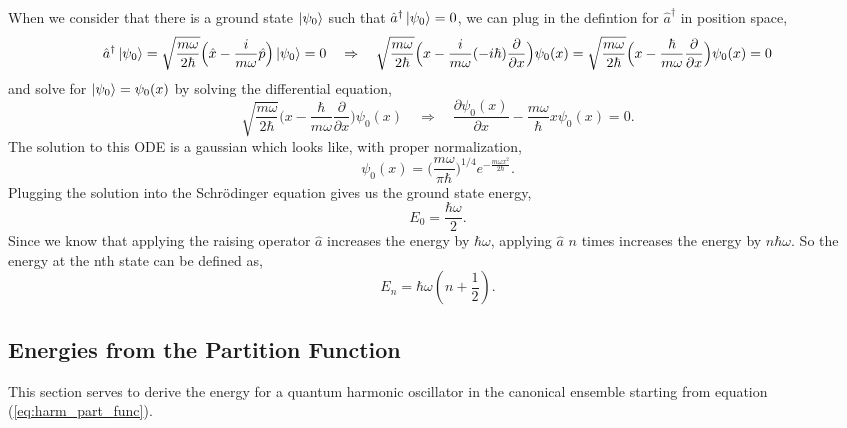 \documentclass{article}
\newcommand{\be}{\begin{equation}}
\newcommand{\ee}{\end{equation}}
\begin{document}
When we consider that there is a ground state $\ket{\psi_0}$ such that $\hat{a}^{\dagger}\ket{\psi_0} = 0$, we can plug in the defintion for $\hat{a}^{\dagger}$ in position space,
\be
  \hat{a}^{\dagger} \ket{\psi_0} = \sqrt{\frac{m \omega}{2\hbar}}\Big(\hat{x} - \frac{i}{m \omega} \hat{p} \Big)\ket{\psi_0} = 0 \quad \Rightarrow \quad \sqrt{\frac{m \omega}{2\hbar}}\Big(x - \frac{i}{m \omega} (-i \hbar) \frac{\partial}{\partial x} \Big) \psi_0(x) = \sqrt{\frac{m \omega}{2\hbar}}\Big(x - \frac{\hbar}{m \omega} \frac{\partial}{\partial x} \Big) \psi_0(x) = 0
\ee
and solve for $\ket{\psi_0} = \psi_0(x)$ by solving the differential equation,
\be
  \sqrt{\frac{m \omega}{2\hbar}}\Big(x - \frac{\hbar}{m \omega} \frac{\partial}{\partial x} \Big) \psi_0(x) \quad \Rightarrow \quad \frac{\partial \psi_0(x)}{\partial x} - \frac{m \omega}{\hbar} x \psi_0(x) = 0 .
\ee
The solution to this ODE is a gaussian which looks like, with proper normalization,
\be
  \psi_0(x) = \Big(\frac{m \omega}{\pi \hbar}\Big)^{1/4} e^{-\frac{m \omega x^2}{2 \hbar}} .
\ee
Plugging the solution into the Schr\"odinger equation gives us the ground state energy,
\be
  E_0 = \frac{\hbar \omega}{2} .
\ee
Since we know that applying the raising operator $\hat{a}$ increases the energy by $\hbar \omega$, applying $\hat{a}$ $n$ times increases the energy by $n \hbar \omega$.
So the energy at the nth state can be defined as,
\be
  E_n = \hbar \omega(n + \frac{1}{2}) .
\ee

\subsection{Energies from the Partition Function}
This section serves to derive the energy for a quantum harmonic oscillator in the canonical ensemble starting from equation (\ref{eq:harm_part_func}).
\end{document}
